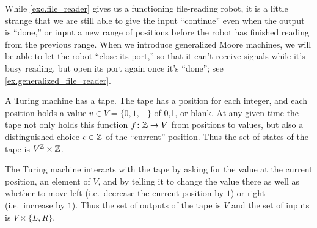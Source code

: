 \documentclass[Book-Poly]{subfiles}
\begin{document}
While \cref{exc.file_reader} gives us a functioning file-reading robot, it is a little strange that we are still able to give the input ``continue'' even when the output is ``done,'' or input a new range of positions before the robot has finished reading from the previous range.
When we introduce generalized Moore machines, we will be able to let the robot ``close its port,'' so that it can't receive signals while it's busy reading, but open its port again once it's ``done''; see \cref{ex.generalized_file_reader}.

\begin{exercise}
A Turing machine has a tape. The tape has a position for each integer, and each position holds a value $v\in V=\{0,1,-\}$ of 0,1, or blank. At any given time the tape not only holds this function $f\colon\mathbb{Z}\to V$ from positions to values, but also a distinguished choice $c\in\mathbb{Z}$ of the ``current'' position. Thus the set of states of the tape is $V^{\mathbb{Z}}\times\mathbb{Z}$.

The Turing machine interacts with the tape by asking for the value at the current position, an element of $V$, and by telling it to change the value there as well as whether to move left (i.e.\ decrease the current position by $1$) or right (i.e.\ increase by $1$). Thus the set of outputs of the tape is $V$ and the set of inputs is $V\times\{L,R\}$.


\end{exercise}
\end{document}
